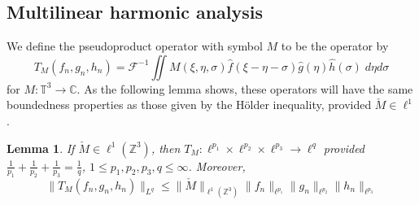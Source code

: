 \documentclass[letterpaper, reqno,final]{amsart}
\newcommand{\bbZ}{\mathbb{Z}}
\newcommand{\bbT}{\mathbb{T}}
\newcommand{\bbC}{\mathbb{C}}
\newtheorem{lemma}[thm]{Lemma}
\begin{document}
\subsection{Multilinear harmonic analysis}

We define the pseudoproduct operator with symbol $M$ to be the operator by
\begin{equation*}
    T_M(f_n,g_n,h_n) = \mathcal{F}^{-1} \iint M(\xi, \eta, \sigma) \hat f(\xi - \eta - \sigma) \hat g(\eta) \hat h(\sigma)\;d\eta d\sigma
\end{equation*}
for $M: \bbT^3 \to \bbC$.  As the following lemma shows, these operators will have the same boundedness properties as those given by the H\"{o}lder inequality, provided $\check{M} \in \ell^1$.

\begin{lemma}\label{thm:multiplier-lemma}
    If $\check{M} \in \ell^1(\bbZ^3)$, then $T_M : \ell^{p_1} \times \ell^{p_2} \times \ell^{p_3} \to \ell^{q}$ provided $\frac{1}{p_1} + \frac{1}{p_2} + \frac{1}{p_3} = \frac{1}{q}$, $1 \leq p_1, p_2, p_3, q \leq \infty$.  Moreover, 
    \begin{equation}
        \lVert T_M(f_n,g_n,h_n) \rVert_{L^q} \leq \lVert \check{M}\rVert_{\ell^1(\bbZ^3)}\lVert f_n \rVert_{\ell^{p_1}}\lVert g_n \rVert_{\ell^{p_2}}\lVert h_n \rVert_{\ell^{p_3}}
    \end{equation}
\end{lemma}
\end{document}
